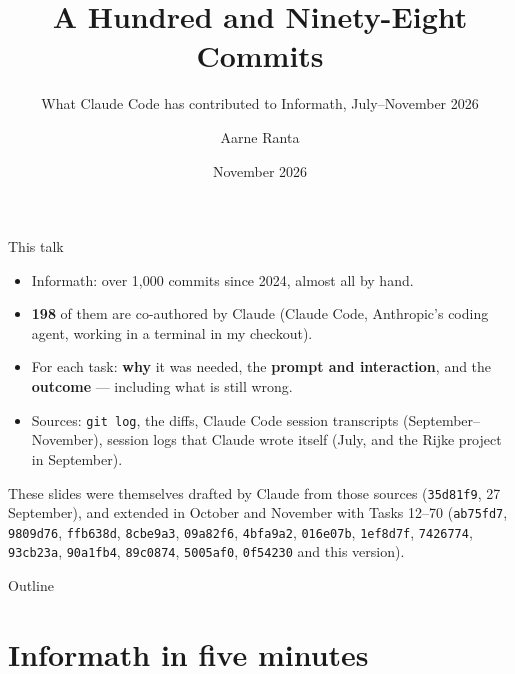 \documentclass[10pt,aspectratio=169]{beamer}
\title{A Hundred and Ninety-Eight Commits}
\subtitle{What Claude Code has contributed to Informath, July--November 2026}
\author{Aarne Ranta}
\date{November 2026}
\newcommand{\commit}[1]{\texttt{\footnotesize #1}}
\begin{document}
\maketitle

\begin{frame}{This talk}
  \begin{itemize}
    \item Informath: over 1,000 commits since 2024, almost all by hand.
    \item \textbf{198} of them are co-authored by Claude (Claude Code, Anthropic's
          coding agent, working in a terminal in my checkout).
    \item For each task: \textbf{why} it was needed, the \textbf{prompt and
          interaction}, and the \textbf{outcome} --- including what is still wrong.
    \item Sources: \texttt{git log}, the diffs, Claude Code session transcripts
          (September--November), session logs that Claude wrote itself
          (July, and the Rijke project in September).
  \end{itemize}

  \vspace{0.5em}
  \small
  These slides were themselves drafted by Claude from those sources
  (\commit{35d81f9}, 27 September), and extended in October and November with Tasks 12--70
  (\commit{ab75fd7}, \commit{9809d76}, \commit{ffb638d}, \commit{8cbe9a3},
  \commit{09a82f6}, \commit{4bfa9a2}, \commit{016e07b}, \commit{1ef8d7f}, \commit{7426774},
  \commit{93cb23a}, \commit{90a1fb4}, \commit{89c0874}, \commit{5005af0}, \commit{0f54230} and this version).
\end{frame}

\begin{frame}{Outline}
  \small\tableofcontents
\end{frame}

\section{Informath in five minutes}
\end{document}
